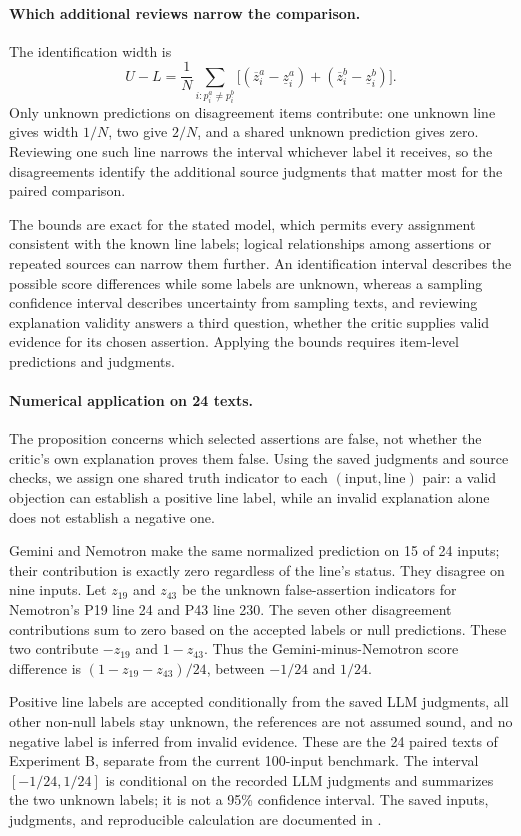 \paragraph{Which additional reviews narrow the comparison.}
The identification width is
\[
U-L=\frac1N\sum_{i:p_i^a\ne p_i^b}
\bigl[(\overline z_i^a-\underline z_i^a)+(\overline z_i^b-\underline z_i^b)\bigr].
\]
Only unknown predictions on disagreement items contribute: one unknown line gives width $1/N$, two give $2/N$, and a shared unknown prediction gives zero. Reviewing one such line narrows the interval whichever label it receives, so the disagreements identify the additional source judgments that matter most for the paired comparison.

The bounds are exact for the stated model, which permits every assignment consistent with the known line labels; logical relationships among assertions or repeated sources can narrow them further. An identification interval describes the possible score differences while some labels are unknown, whereas a sampling confidence interval describes uncertainty from sampling texts, and reviewing explanation validity answers a third question, whether the critic supplies valid evidence for its chosen assertion. Applying the bounds requires item-level predictions and judgments.

\paragraph{Numerical application on 24 texts.} The proposition concerns which selected assertions are false, not whether the critic's own explanation proves them false. Using the saved judgments and source checks, we assign one shared truth indicator to each $(\text{input}, \text{line})$ pair: a valid objection can establish a positive line label, while an invalid explanation alone does not establish a negative one.

Gemini and Nemotron make the same normalized prediction on 15 of 24 inputs; their contribution is exactly zero regardless of the line's status. They disagree on nine inputs. Let $z_{19}$ and $z_{43}$ be the unknown false-assertion indicators for Nemotron's P19 line 24 and P43 line 230. The seven other disagreement contributions sum to zero based on the accepted labels or null predictions. These two contribute $-z_{19}$ and $1 - z_{43}$. Thus the Gemini-minus-Nemotron score difference is $(1 - z_{19} - z_{43})/24$, between $-1/24$ and $1/24$.

Positive line labels are accepted conditionally from the saved LLM judgments, all other non-null labels stay unknown, the references are not assumed sound, and no negative label is inferred from invalid evidence. These are the 24 paired texts of Experiment B, separate from the current 100-input benchmark. The interval $[-1/24,1/24]$ is conditional on the recorded LLM judgments and summarizes the two unknown labels; it is not a 95\% confidence interval. The saved inputs, judgments, and reproducible calculation are documented in .

